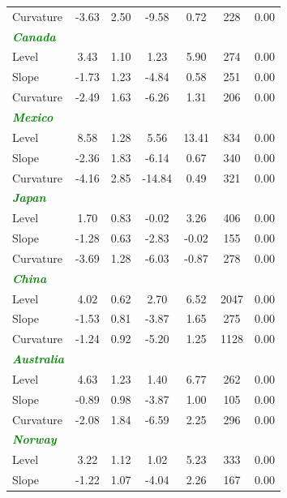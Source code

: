 \documentclass[12pt,bibliography=totoc]{article}
\begin{document}
\begin{table}[H]
\begin{tabular}{l c c c c c c}
Curvature					&	-3.63	&	2.50	&	-9.58	&	0.72	&	228	&	0.00	\\
\textcolor{green}{\textit{\textbf{Canada}}}				&		&		&		&		&		&		\\
Level						&	3.43	&	1.10	&	1.23	&	5.90	&	274	&	0.00	\\
Slope				&	-1.73	&	1.23	&	-4.84	&	0.58	&	251	&	0.00	\\
													
Curvature					&	-2.49	&	1.63	&	-6.26	&	1.31	&	206	&	0.00	\\
\textcolor{green}{\textit{\textbf{Mexico}}}				&		&		&		&		&		&		\\
Level						&	8.58	&	1.28	&	5.56	&	13.41&	834	&	0.00	\\
Slope				&	-2.36	&	1.83	&	-6.14	&	0.67	&	340	&	0.00	\\												
Curvature					&	-4.16	&	2.85&	-14.84&	0.49	&	321	&	0.00	\\
\textcolor{green}{\textit{\textbf{Japan}}}				&		&		&		&		&		&		\\
Level						&	1.70	&	0.83	&	-0.02	&	3.26	&	406	&	0.00	\\
Slope				&	-1.28	&	0.63	&	-2.83	&	-0.02	&	155	&	0.00	\\
													
Curvature					&	-3.69	&	1.28	&	-6.03	&	-0.87	&	278	&	0.00	\\
\textcolor{green}{\textit{\textbf{China}}}				&		&		&		&		&		&		\\
Level						&	4.02	&	0.62	&	2.70	&	6.52 &	2047	&	0.00	\\
Slope				&	-1.53	&	0.81	&	-3.87	&	1.65 &	275	&	0.00	\\
													
Curvature					&	-1.24	&	0.92	&	-5.20	&	1.25&	1128	&	0.00	\\
\textcolor{green}{\textit{\textbf{Australia}}}			&		&		&		&		&		&		\\
Level						&	4.63	&	1.23	&	1.40	&	6.77	&	262	&	0.00	\\
Slope				&	-0.89	&	0.98	&	-3.87	&	1.00	&	105	&	0.00	\\
													
Curvature					&	-2.08	&	1.84	&	-6.59	&	2.25	&	296	&	0.00	\\
\textcolor{green}{\textit{\textbf{Norway}}}				&		&		&		&		&		&		\\
Level						&	3.22	&	1.12	&	1.02	&	5.23	&	333	&	0.00	\\
Slope				&	-1.22	&	1.07	&	-4.04	&	2.26	&	167	&	0.00	\\
													

\end{tabular}
\end{table}
\end{document}

